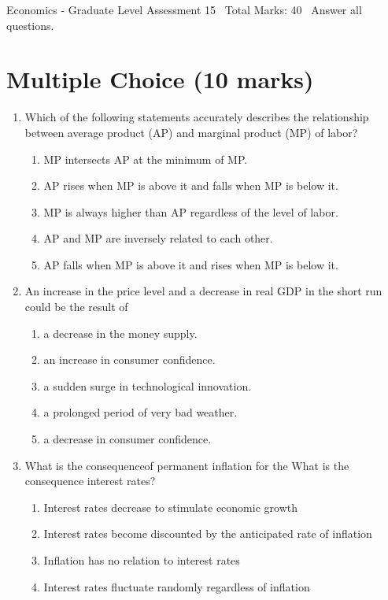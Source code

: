 \documentclass[12pt]{article}
\begin{document}
\begin{center}
Economics - Graduate Level Assessment 15 \
Total Marks: 40 \
Answer all questions.
\end{center}

\section*{Multiple Choice (10 marks)}
\begin{enumerate}[label=\arabic*.]
\item Which of the following statements accurately describes the relationship between average product (AP) and marginal product (MP) of labor?
\begin{enumerate}[label=(\alph*)]
    \item MP intersects AP at the minimum of MP.
    \item AP rises when MP is above it and falls when MP is below it.
    \item MP is always higher than AP regardless of the level of labor.
    \item AP and MP are inversely related to each other.
    \item AP falls when MP is above it and rises when MP is below it.
\end{enumerate}
\item An increase in the price level and a decrease in real GDP in the short run could be the result of
\begin{enumerate}[label=(\alph*)]
    \item a decrease in the money supply.
    \item an increase in consumer confidence.
    \item a sudden surge in technological innovation.
    \item a prolonged period of very bad weather.
    \item a decrease in consumer confidence.
\end{enumerate}
\item What is the consequenceof permanent inflation for the What is the consequence interest rates?
\begin{enumerate}[label=(\alph*)]
    \item Interest rates decrease to stimulate economic growth
    \item Interest rates become discounted by the anticipated rate of inflation
    \item Inflation has no relation to interest rates
    \item Interest rates fluctuate randomly regardless of inflation

\end{enumerate}
\end{enumerate}
\end{document}
